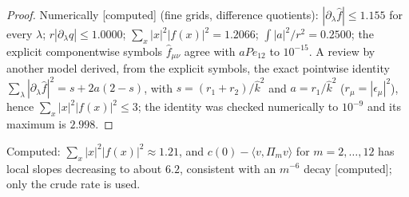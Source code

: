 \documentclass[11pt,a4paper]{article}
\theoremstyle{plain}
\theoremstyle{definition}
\theoremstyle{remark}
\numberwithin{equation}{section}
\newcommand{\st}[1]{\textsf{[#1]}}
\begin{document}
\begin{proof}
Numerically \st{computed} (fine grids, difference quotients): $|\partial_\lambda\hat f|\le1.155$ for every $\lambda$; $r|\partial_\lambda q|\le1.0000$; $\sum_x|x|^2|f(x)|^2=1.2066$; $\int|a|^2/r^2=0.2500$; the explicit componentwise symbols $\hat f_{\mu\nu}$ agree with $aPe_{12}$ to $10^{-15}$. A review by another model derived, from the explicit symbols, the exact pointwise identity $\sum_\lambda|\partial_\lambda\hat f|^2=s+2a(2-s)$, with $s=(r_1+r_2)/\hat k^2$ and $a=r_1/\hat k^2$ ($r_\mu=|\epsilon_\mu|^2$), hence $\sum_x|x|^2|f(x)|^2\le3$; the identity was checked numerically to $10^{-9}$ and its maximum is $2.998$.
\end{proof}
Computed: $\sum_x|x|^2|f(x)|^2\approx1.21$, and $c(0)-\langle v,\Pi_mv\rangle$ for $m=2,\dots,12$ has local slopes decreasing to about $6.2$,
consistent with an $m^{-6}$ decay \st{computed}; only the crude rate is used.
\end{document}
